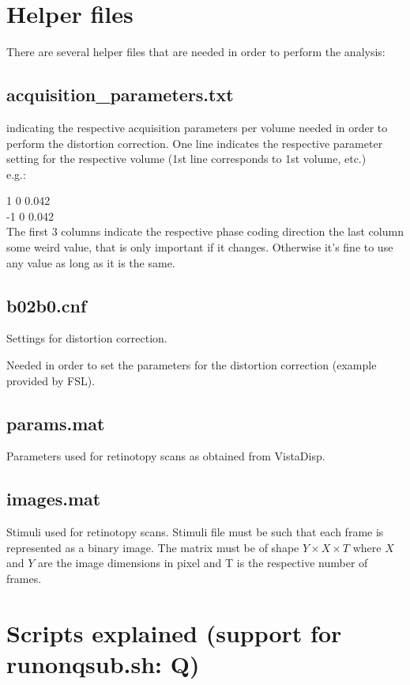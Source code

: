 \documentclass[12pt,a4paper]{scrartcl}
\begin{document}
\FloatBarrier
\section{Helper files}
There are several helper files that are needed in order to perform the analysis:

\subsection{acquisition\_parameters.txt}
indicating the respective acquisition parameters per volume needed in order to perform the distortion correction. One line indicates the respective parameter setting for the respective volume (1st line corresponds to 1st volume, etc.)\\

\noindent e.g.:

 1 0 0.042\\
 -1 0 0.042\\

The first 3 columns indicate the respective phase coding direction the last column some weird value, that is only important if it changes. Otherwise it's fine to use any value as long as it is the same.

\subsection{b02b0.cnf}
Settings for distortion correction.

Needed in order to set the parameters for the distortion correction (example provided by FSL).

\subsection{params.mat}
Parameters used for retinotopy scans as obtained from VistaDisp.

\subsection{images.mat}
Stimuli used for retinotopy scans. Stimuli file must be such that each frame is represented as a binary image. The matrix must be of shape $Y \times X \times T$ where $X$ and $Y$ are the image dimensions in pixel and T is the respective number of frames.

\section{Scripts explained (support for runonqsub.sh: Q)}
\end{document}
